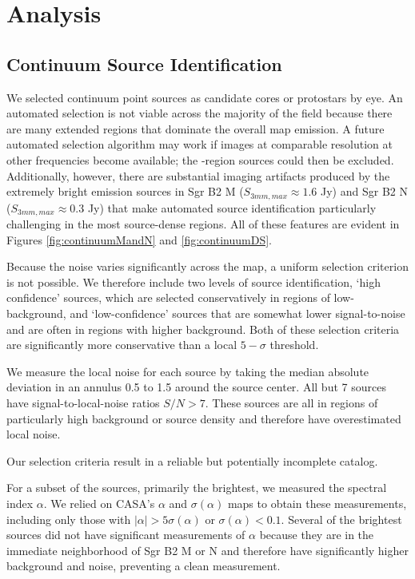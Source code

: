 \documentclass[twocolumn]{aastex61}
\begin{document}
\section{Analysis}

\subsection{Continuum Source Identification}
\label{sec:contsources}
We selected continuum point sources as candidate cores or protostars by eye.
An automated selection is not viable across the majority of the field because
there are many extended \hii regions that dominate the overall map emission.  A
future automated selection algorithm may work if images at comparable
resolution at other frequencies become available; the \hii-region sources could
then be excluded.  Additionally, however, there are substantial imaging
artifacts produced by the extremely bright emission sources in Sgr B2 M ($S_{3
mm,max} \approx 1.6$ Jy) and Sgr B2 N ($S_{3 mm,max} \approx 0.3$ Jy) that make automated
source identification particularly challenging in the most source-dense regions.
All of these features are evident in Figures \ref{fig:continuumMandN} and
\ref{fig:continuumDS}.

Because the noise varies significantly across the map, a uniform selection
criterion is not possible.  We therefore include two levels of source
identification, `high confidence' sources, which are selected conservatively in
regions of low-background, and `low-confidence' sources that are somewhat lower
signal-to-noise and are often in regions with higher background.  Both of
these selection criteria are significantly more conservative than a local
$5-\sigma$ threshold.

We measure the local noise for each source by taking the median absolute
deviation in an annulus 0.5 to 1.5 \arcsec around the source center.
All but 7 sources have signal-to-local-noise ratios $S/N>7$.  These
sources are all in regions of particularly high background or source
density and therefore have overestimated local noise.

Our selection criteria result in a reliable but potentially incomplete catalog.

For a subset of the sources, primarily the brightest, we measured the spectral
index $\alpha$.  We relied on CASA's $\alpha$ and $\sigma(\alpha)$ maps to
obtain these measurements, including only those with $|\alpha| > 5
\sigma(\alpha)$ or $\sigma(\alpha) < 0.1$.  Several of the brightest sources
did not have significant measurements of $\alpha$ because they are in the
immediate neighborhood of Sgr B2 M or N and therefore have significantly higher
background and noise, preventing a clean measurement.
\end{document}
